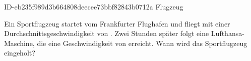 \begin{exercise}
      {ID-eb235f989d3b664808deecee73bbf82843b0712a}
      {Flugzeug}
  \ifproblem\problem\par
    Ein Sportflugzeug startet vom Frankfurter Flughafen und fliegt mit einer
    Durchschnittsgeschwindigkeit von . Zwei Stunden später folgt eine
    Lufthansa-Maschine, die eine Geschwindigkeit von  erreicht.
    Wann wird das Sportflugzeug eingeholt?
  \fi
\end{exercise}
